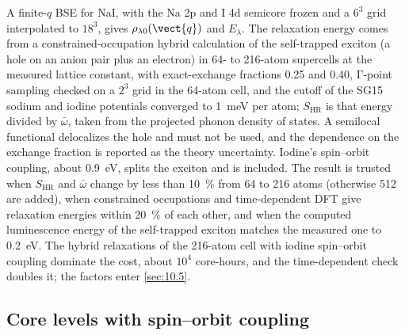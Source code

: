 A finite-$q$ BSE for NaI, with the Na 2p and I 4d semicore frozen and a $6^3$ grid interpolated to $18^3$, gives $\rho_{\lambda0}(\vect{q})$ and $E_\lambda$. The relaxation energy comes from a constrained-occupation hybrid calculation of the self-trapped exciton (a hole on an anion pair plus an electron) in 64- to 216-atom supercells at the measured lattice constant, with exact-exchange fractions 0.25 and 0.40, $\mathrm{\Gamma}$-point sampling checked on a $2^3$ grid in the 64-atom cell, and the cutoff of the SG15 sodium and iodine potentials converged to \SI{1}{meV} per atom; $S_{\mathrm{HR}}$ is that energy divided by $\bar\omega$, taken from the projected phonon density of states. A semilocal functional delocalizes the hole and must not be used, and the dependence on the exchange fraction is reported as the theory uncertainty. Iodine's spin--orbit coupling, about \SI{0.9}{eV}, splits the exciton and is included. The result is trusted when $S_{\mathrm{HR}}$ and $\bar\omega$ change by less than \SI{10}{\percent} from 64 to 216 atoms (otherwise 512 are added), when constrained occupations and time-dependent DFT give relaxation energies within \SI{20}{\percent} of each other, and when the computed luminescence energy of the self-trapped exciton matches the measured one to \SI{0.2}{eV}. The hybrid relaxations of the 216-atom cell with iodine spin--orbit coupling dominate the cost, about $10^4$ core-hours, and the time-dependent check doubles it; the factors enter \cref{sec:10.5}.

\subsection{Core levels with spin--orbit coupling}

